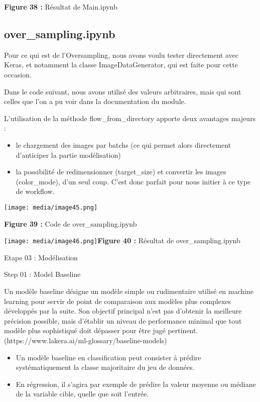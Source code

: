 \textbf{Figure 38 : }Résultat\textbf{ }de Main.ipynb

\subsection{over\_sampling.ipynb}\label{over_sampling.ipynb}

Pour ce qui est de l'Oversampling, nous avons voulu tester directement
avec Keras, et notamment la classe ImageDataGenerator, qui est faite
pour cette occasion.

Dans le code suivant, nous avons utilisé des valeurs arbitraires, mais
qui sont celles que l'on a pu voir dans la documentation du module.

L'utilisation de la méthode flow\_from\_directory apporte deux avantages
majeurs :

\begin{itemize}
\tightlist
\item
  le chargement des images par batchs (ce qui permet alors directement
  d'anticiper la partie modélisation)
\item
  la possibilité de redimensionner (target\_size) et convertir les
  images (color\_mode), d'un seul coup. C'est donc parfait pour nous
  initier à ce type de workflow.
\end{itemize}

\texttt{[image: media/image45.png]}

\textbf{Figure 39 : }Code\textbf{ }de over\_sampling.ipynb

\texttt{[image: media/image46.png]}\textbf{Figure
40 :} Résultat\textbf{ }de over\_sampling.ipynb

Etape 03 : Modélisation

Step 01 : Model Baseline

Un modèle baseline désigne un modèle simple ou rudimentaire utilisé en
machine learning pour servir de point de comparaison aux modèles plus
complexes développés par la suite. Son objectif principal n'est pas
d'obtenir la meilleure précision possible, mais d'établir un niveau de
performance minimal que tout modèle plus sophistiqué doit dépasser pour
être jugé pertinent. (https://www.lakera.ai/ml-glossary/baseline-models)

\begin{itemize}
\tightlist
\item
  Un modèle baseline en classification peut consister à prédire
  systématiquement la classe majoritaire du jeu de données.
\item
  En régression, il s'agira par exemple de prédire la valeur moyenne ou
  médiane de la variable cible, quelle que soit l'entrée.
\end{itemize}

